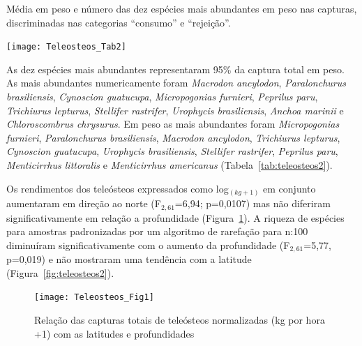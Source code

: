 \documentclass[a4paper,11pt,twoside,showtrims,onecolumn,openright,final]{memoir}
\begin{document}
%
%

\begin{table}
\caption[Média em peso e número das dez espécies mais abundantes em peso nas capturas.]
	{Média em peso e número das dez espécies mais abundantes em peso nas capturas, 
         discriminadas nas categorias ``consumo'' e ``rejeição''.}
\label{tab:teleosteos2}
\begin{center}
\texttt{[image: Teleosteos\_Tab2]}
\end{center}
\end{table}


As dez espécies mais abundantes representaram 95\% da captura total em peso. 
As mais abundantes numericamente foram \emph{Macrodon ancylodon}, \emph{Paralonchurus brasiliensis}, 
\emph{Cynoscion guatucupa}, \emph{Micropogonias furnieri}, \emph{Peprilus paru}, \emph{Trichiurus lepturus}, 
\emph{Stellifer rastrifer}, \emph{Urophycis brasiliensis}, \emph{Anchoa marinii} e \emph{Chloroscombrus chrysurus}. 
Em peso as mais abundantes foram \emph{Micropogonias furnieri}, \emph{Paralonchurus brasiliensis}, 
\emph{Macrodon ancylodon}, \emph{Trichiurus lepturus}, \emph{Cynoscion guatucupa}, \emph{Urophycis brasiliensis}, 
\emph{Stellifer rastrifer}, \emph{Peprilus paru}, \emph{Menticirrhus littoralis} 
e \emph{Menticirrhus americanus} (Tabela~\ref{tab:teleosteos2}).

Os rendimentos dos teleósteos expressados como log$_{(kg+1)}$ em conjunto aumentaram em direção 
ao norte (F$_{2,61}$=6,94; p=0,0107) mas não diferiram significativamente em relação 
a profundidade (Figura~\ref{fig:teleosteos1}).  
A riqueza de espécies para amostras padronizadas por um algoritmo de rarefação para n:100 diminuíram 
significativamente com o aumento da profundidade (F$_{2,61}$=5,77, p=0,019) e não mostraram uma tendência 
com a latitude (Figura~\ref{fig:teleosteos2}). 


%
%

\begin{figure}
\begin{center}
\texttt{[image: Teleosteos\_Fig1]}
\end{center}
\caption[Relação das capturas totais de teleósteos normalizadas com as latitudes e profundidades]
	{Relação das capturas totais de teleósteos normalizadas (kg por hora +1) com as latitudes e profundidades}
\label{fig:teleosteos1}
\end{figure}
\end{document}
